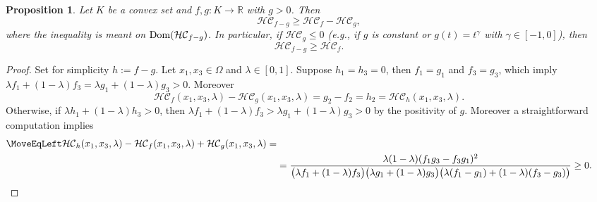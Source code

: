 \documentclass[11pt, reqno]{amsart}
\newtheorem{proposition}[lemma]{Proposition}
\theoremstyle{definition}
\newtheorem{remark}[lemma]{Remark}
\numberwithin{equation}{section}
\newcommand{\R}{\mathbb{R}}
\newcommand{\mc}[1]{\mathcal{#1}}
\newcommand{\Dom}{{\rm Dom}}
\newcommand{\tr}[1]{{\color{red} #1}}
\begin{document}
\begin{proposition}\label{proposition f-k and harmonic concavity function}
	Let $K$ be a convex set and $f,g :K\to \R $ with $g>0$. 
	Then 
	\begin{equation}\label{eq: stime su HC f-g}
		\mathcal{HC}_{f-g}\geq \mathcal{HC}_f - \mathcal{HC}_g,
	\end{equation}
where the inequality is meant on $\Dom(\mc{HC}_{f-g})$. %
	In particular, if $\mathcal{HC}_g \leq 0$ (e.g., if $g$ is constant or $g(t)=t^{\gamma}$ with $\gamma \in [-1,0]$), then
		$$\mathcal{HC}_{f-g}\geq \mathcal{HC}_f.$$
\end{proposition}
		\begin{proof}
	Set for simplicity $h:=f-g$.
	Let $x_1,x_3\in \Omega$ and $\lambda \in [0,1]$. 
		Suppose $h_1=h_3=0$, then $f_1=g_1$ and $f_3=g_3$, which imply $\lambda f_1+(1-\lambda)f_3 =\lambda g_1+(1-\lambda)g_3 >0 $. 
		Moreover
		$$		\mathcal{HC}_f(x_1,x_3,\lambda)- \mathcal{HC}_g(x_1,x_3,\lambda)= g_2-f_2 = h_2 = \mc{HC}_h(x_1,x_3,\lambda).$$
		Otherwise, if $\lambda h_1+(1-\lambda) h_3>0$, then $\lambda f_1+(1-\lambda) f_3>\lambda g_1 + (1-\lambda) g_3 >0$ by the positivity of $g$.
		Moreover a straightforward computation implies
		\begin{align*}
	\MoveEqLeft	\mc{HC}_h(x_1,x_3,\lambda) -\mc{HC}_f(x_1,x_3,\lambda) +\mc{HC}_g(x_1,x_3,\lambda) =& \\
		&= \frac{\lambda(1-\lambda)(f_1 g_3 - f_3 g_1)^2}{\big(\lambda f_1 + (1-\lambda)f_3 \big) \big(\lambda g_1 + (1-\lambda) g_3\big) \big( \lambda (f_1-g_1) + (1-\lambda) (f_3-g_3)\big)} \geq 0. 	\tag*{\qedhere}
		\end{align*}
	\end{proof}
\medskip


\printbibliography[title={References}]
\end{document}
